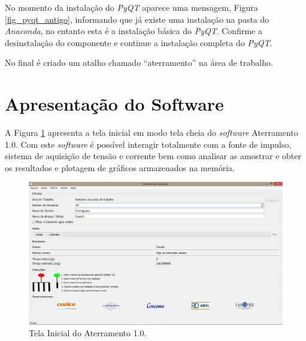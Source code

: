 \documentclass[a4paper, 10pt]{article}
\begin{document}
No momento da instalação do \textit{PyQT} aparece uma mensagem, Figura \ref{fig_pyqt_antigo},  informando que 
já existe uma instalação na pasta do \textit{Anaconda}, no entanto esta é a instalação básica do \textit{PyQT}. 
Confirme a desinstalação do componente e continue a instalação completa do \textit{PyQT}.



No final é criado um atalho chamado ``aterramento'' na área de trabalho.


\section{Apresentação do Software}

A Figura \ref{fig_tela_inicial} apresenta a tela inicial em modo tela cheia do \textit{software} Aterramento 1.0. 
Com este \textit{software} é possível interagir totalmente com a fonte de impulso, sistema de aquisição de 
tensão e corrente bem como analisar as amostrar e obter os resultados e plotagem de 
gráficos armazenados na memória.

\begin{figure}[!h]
    \caption{\label{fig_tela_inicial}Tela Inicial do Aterramento 1.0.}
	    \begin{center}
            \includegraphics[scale=0.3]{../fotos/execucao/tela_inicial.png}
	    \end{center}
\end{figure}
\end{document}
